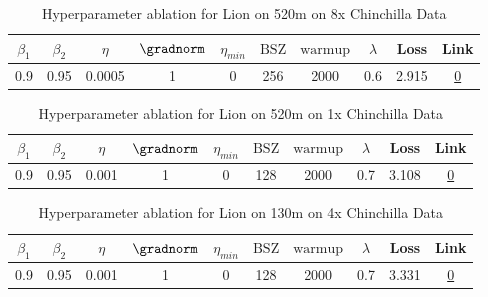 \begin{table}[H]
\centering
\caption{Hyperparameter ablation for Lion on 520m on 8x Chinchilla Data}
\label{tab:ablation_lion_520m_8}
\begin{tabular}{cccccccccc}
\toprule
$\beta_1$ & $\beta_2$ & $\eta$ & $\gradnorm$ & $\eta_{min}$ & $\mathrm{BSZ}$ & $\mathrm{warmup}$ & $\lambda$ & Loss & Link \\
\midrule
0.9 & 0.95 & 0.0005 & 1 & 0 & 256 & 2000 & 0.6 & 2.915 & \href{https://wandb.ai/stanford-mercury/optimizer-scaling/runs/sweep-520m-85B-lionf86a38lr0.0005-wd0.6-minlr0-warmup2000-b10.9--54ea21}{0} \\
\midrule
\bottomrule
\end{tabular}
\end{table}

\begin{table}[H]
\centering
\caption{Hyperparameter ablation for Lion on 520m on 1x Chinchilla Data}
\label{tab:ablation_lion_520m_1}
\begin{tabular}{cccccccccc}
\toprule
$\beta_1$ & $\beta_2$ & $\eta$ & $\gradnorm$ & $\eta_{min}$ & $\mathrm{BSZ}$ & $\mathrm{warmup}$ & $\lambda$ & Loss & Link \\
\midrule
0.9 & 0.95 & 0.001 & 1 & 0 & 128 & 2000 & 0.7 & 3.108 & \href{https://wandb.ai/stanford-mercury/optimizer-scaling/runs/sweep-520m-10B-liond8061alr0.001-wd0.7-minlr0-warmup2000-b10.9-b-942db7}{0} \\
\midrule
\bottomrule
\end{tabular}
\end{table}

\begin{table}[H]
\centering
\caption{Hyperparameter ablation for Lion on 130m on 4x Chinchilla Data}
\label{tab:ablation_lion_130m_4}
\begin{tabular}{cccccccccc}
\toprule
$\beta_1$ & $\beta_2$ & $\eta$ & $\gradnorm$ & $\eta_{min}$ & $\mathrm{BSZ}$ & $\mathrm{warmup}$ & $\lambda$ & Loss & Link \\
\midrule
0.9 & 0.95 & 0.001 & 1 & 0 & 128 & 2000 & 0.7 & 3.331 & \href{https://wandb.ai/stanford-mercury/optimizer-scaling/runs/sweep-130m-10B-liondd8061alr0.001-wd0.7-minlr0-warmup2000-b10.9--72b789}{0} \\
\midrule
\bottomrule
\end{tabular}
\end{table}

